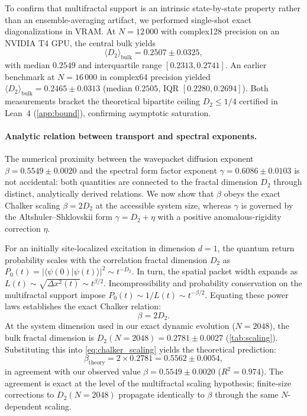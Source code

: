 \documentclass[11pt,a4paper]{article}
\begin{document}
To confirm that multifractal support is an intrinsic state-by-state property rather than an ensemble-averaging artifact, we performed single-shot exact diagonalizations in VRAM. At $N=12\,000$ with complex128 precision on an NVIDIA T4 GPU, the central bulk yields
\begin{equation}
\langle D_2 \rangle_{\text{bulk}} = 0.2507 \pm 0.0325,
\end{equation}
with median $0.2549$ and interquartile range $[0.2313, 0.2741]$. An earlier benchmark at $N=16\,000$ in complex64 precision yielded $\langle D_2 \rangle_{\text{bulk}} = 0.2465 \pm 0.0313$ (median $0.2505$, IQR $[0.2280, 0.2694]$). Both measurements bracket the theoretical bipartite ceiling $D_2 \le 1/4$ certified in Lean~4 (\cref{app:bound}), confirming asymptotic saturation.

\paragraph{Analytic relation between transport and spectral exponents.}
The numerical proximity between the wavepacket diffusion exponent
$\beta = 0.5549 \pm 0.0020$ and the spectral form factor exponent
$\gamma = 0.6086 \pm 0.0103$ is not accidental: both quantities are
connected to the fractal dimension $D_2$ through distinct, analytically
derived relations. We now show that $\beta$ obeys the exact Chalker
scaling $\beta = 2 D_2$ at the accessible system size, whereas $\gamma$
is governed by the Altshuler--Shklovskii form $\gamma = D_2 + \eta$ with
a positive anomalous-rigidity correction $\eta$.

For an initially site-localized excitation in dimension $d=1$, the quantum return probability scales with the correlation fractal dimension $D_2$ as $P_0(t) = |\langle \psi(0) | \psi(t) \rangle|^2 \sim t^{-D_2}$. In turn, the spatial packet width expands as $L(t) \sim \sqrt{\Delta x^2(t)} \sim t^{\beta/2}$. Incompressibility and probability conservation on the multifractal support impose $P_0(t) \sim 1/L(t) \sim t^{-\beta/2}$. Equating these power laws establishes the exact Chalker relation:
\begin{equation}
\beta = 2 D_2.
\label{eq:chalker_scaling}
\end{equation}
At the system dimension used in our exact dynamic evolution ($N = 2048$), the bulk fractal dimension is $D_2(N=2048) = 0.2781 \pm 0.0027$ (\cref{tab:scaling}). Substituting this into \cref{eq:chalker_scaling} yields the theoretical prediction:
\begin{equation}
\beta_{\text{theory}} = 2 \times 0.2781 = 0.5562 \pm 0.0054,
\end{equation}
in agreement with our observed value $\beta = 0.5549 \pm 0.0020$ ($R^2 = 0.974$). The agreement is exact at the level of the multifractal scaling hypothesis; finite-size corrections to $D_2(N=2048)$ propagate identically to $\beta$ through the same $N$-dependent scaling.
\end{document}
